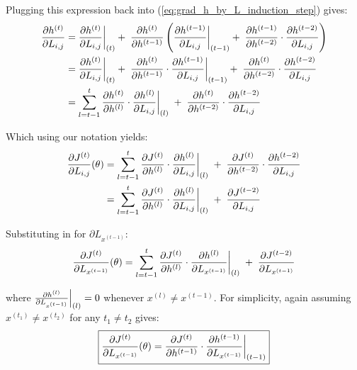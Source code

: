 Plugging this expression back into (\ref{eq:grad_h_by_L_induction_step}) gives:
\begin{equation}
  \begin{aligned}
    \frac{\partial h^{(t)}}{\partial L_{i,j}} &= \restr{\frac{\partial h^{(t)}}{\partial L_{i,j}}}{(t)} +\; \frac{\partial h^{(t)}}{\partial h^{(t-1)}} \left( \restr{\frac{\partial h^{(t-1)}}{\partial L_{i,j}}}{(t-1)} +\; \frac{\partial h^{(t-1)}}{\partial h^{(t-2)}} \cdot \frac{\partial h^{(t-2)}}{\partial L_{i,j}} \right) \\
    &= \restr{\frac{\partial h^{(t)}}{\partial L_{i,j}}}{(t)} +\; \frac{\partial h^{(t)}}{\partial h^{(t-1)}} \cdot \restr{\frac{\partial h^{(t-1)}}{\partial L_{i,j}}}{(t-1)} +\; \frac{\partial h^{(t)}}{\partial h^{(t-2)}} \cdot \frac{\partial h^{(t-2)}}{\partial L_{i,j}} \\
    &= \sum_{l=t-1}^{t}  \frac{\partial h^{(t)}}{\partial h^{(l)}} \cdot \restr{\frac{\partial h^{(l)}}{\partial L_{i,j}}}{(l)} \; + \; \frac{\partial h^{(t)}}{\partial h^{(t-2)}} \cdot \frac{\partial h^{(t-2)}}{\partial L_{i,j}}
  \end{aligned}
\end{equation}

Which using our notation yields:
\begin{equation}
  \begin{aligned}
    \frac{\partial J^{(t)}}{\partial L_{i,j}}(\theta) &= \sum_{l=t-1}^{t} \frac{\partial J^{(t)}}{\partial h^{(l)}} \cdot \restr{\frac{\partial h^{(l)}}{\partial L_{i,j}}}{(l)} \;+\; \frac{\partial J^{(t)}}{\partial h^{(t-2)}} \cdot \frac{\partial h^{(t-2)}}{\partial L_{i,j}} \\
    &= \sum_{l=t-1}^{t} \frac{\partial J^{(t)}}{\partial h^{(l)}} \cdot \restr{\frac{\partial h^{(l)}}{\partial L_{i,j}}}{(l)} \;+\; \frac{\partial J^{(t-2)}}{\partial L_{i,j}}
  \end{aligned}
\end{equation}

Substituting in for $\partial L_{x^{(t-1)}}$:
\begin{equation}
  \frac{\partial J^{(t)}}{\partial L_{x^{(t-1)}}}(\theta) = \sum_{l=t-1}^{t} \frac{\partial J^{(t)}}{\partial h^{(l)}} \cdot \restr{\frac{\partial h^{(l)}}{\partial L_{x^{(t-1)}}}}{(l)} \;+\; \frac{\partial J^{(t-2)}}{\partial L_{x^{(t-1)}}}
\end{equation}

where $\restr{\frac{\partial h^{(l)}}{\partial L_{x^{(t-1)}}}}{(l)} = 0$ whenever $x^{(l)} \neq x^{(t-1)}$. For simplicity, again assuming $x^{(t_1)} \neq x^{(t_2)}$ for any $t_1 \neq t_2$ gives:
\begin{equation}
    \boxed{ \frac{\partial J^{(t)}}{\partial L_{x^{(t-1)}}}(\theta) = \frac{\partial J^{(t)}}{\partial h^{(t-1)}} \cdot \restr{\frac{\partial h^{(t-1)}}{\partial L_{x^{(t-1)}}}}{(t-1)} }
\end{equation}

